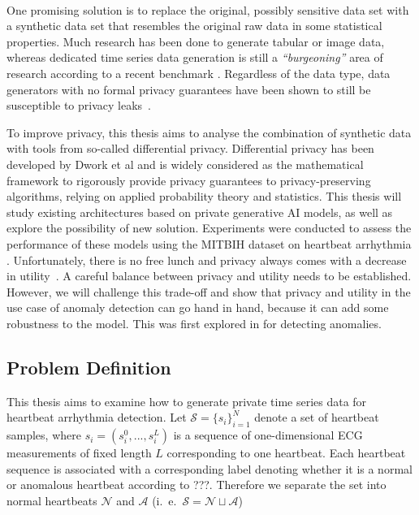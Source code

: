 \paragraph{}
One promising solution \parencite[see][]{jordon2022synthetic} is to replace the original, possibly sensitive data set with a synthetic data set that resembles the original raw data in some statistical properties. Much research has been done to generate tabular or image data, whereas dedicated time series data generation is still a \textit{``burgeoning''} area of research according to a recent benchmark \parencite[][]{ang2023tsgbench}. Regardless of the data type, data generators with no formal privacy guarantees have been shown to still be susceptible to privacy leaks~\cite{stadler2022synthetic}. 

To improve privacy, this thesis aims to analyse the combination of synthetic data with tools from so-called differential privacy. Differential privacy has been developed by Dwork et al \parencite{dwork2006differential} and is widely considered as the mathematical framework to rigorously provide privacy guarantees to privacy-preserving algorithms, relying on applied probability theory and statistics. This thesis will study existing architectures based on private generative AI models, as well as explore the possibility of new solution. Experiments were conducted to assess the performance of these models using the MITBIH dataset on heartbeat arrhythmia \parencite[][]{moody2001impact}. Unfortunately, there is no free lunch and privacy always comes with a decrease in utility~\cite{stadler2022synthetic}. A careful balance between privacy and utility needs to be established. However, we will challenge this trade-off and show that privacy and utility in the use case of anomaly detection can go hand in hand, because it can add some robustness to the model. This was first explored in \Parencite{du2019robust} for detecting anomalies.


\subsection{Problem Definition}

This thesis aims to examine how to generate private time series data for heartbeat arrhythmia detection. Let $\mathcal{S}={\{s_i\}}_{i=1}^N$ denote a set of heartbeat samples, where $s_i=(s_i^0,..., s_i^L)$ is a sequence of one-dimensional ECG measurements of fixed length $L$ corresponding to one heartbeat. Each heartbeat sequence is associated with a corresponding label denoting whether it is a normal or anomalous heartbeat according to ???. Therefore we separate the set into normal heartbeats $\mathcal{N}$ and $\mathcal{A}$ (i.\ e.\ $\mathcal{S} = \mathcal{N} \sqcup \mathcal{A}$)

